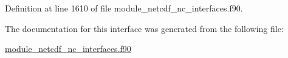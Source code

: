 Definition at line 1610 of file module\+\_\+netcdf\+\_\+nc\+\_\+interfaces.\+f90.



The documentation for this interface was generated from the following file\+:\begin{DoxyCompactItemize}
\item 
\hyperlink{module__netcdf__nc__interfaces_8f90}{module\+\_\+netcdf\+\_\+nc\+\_\+interfaces.\+f90}\end{DoxyCompactItemize}
